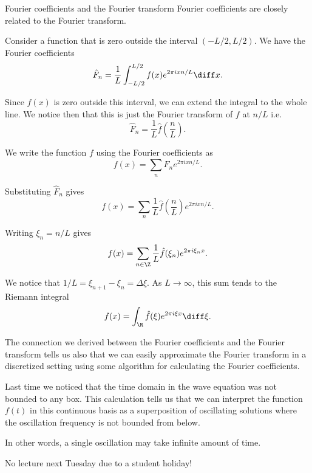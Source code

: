 \begin{frame}{Fourier coefficients and the Fourier transform}
	Fourier coefficients are closely related to the Fourier transform.
	
	\pause
	Consider a function that is zero outside the interval $ (-L/2,L/2) $. We have the Fourier coefficients 
	\[ \hat{F}_n = \frac{1}{L} \int_{-L/2}^{L/2} f(x) e^{2\pi i x n/L} \diff x. \]
	
	\pause
	Since $ f(x) $ is zero outside this interval, we can extend the integral to the whole line. We notice then that this is just the Fourier transform of $ f $ at $ n/L $ i.e. 
	\[ \hat{F}_n = \frac{1}{L} \hat{f}\left(\frac{n}{L}\right). \]
	
	\pause
	We write the function $ f $ using the Fourier coefficients as 
	\[ f(x) = \sum_n \hat{F}_n e^{2\pi i x n/L}. \]
	
	\pause
	Substituting $ \hat{F}_n $ gives
	\[ f(x) = \sum_{n} \frac{1}{L} \hat{f}\left(\frac{n}{L}\right) e^{2\pi i x n/L}. \]
\end{frame}

\begin{frame}
	Writing $ \xi_n = n/L $ gives 
	\[ f(x) = \sum_{n\in\Z} \frac{1}{L} \hat{f}(\xi_n) e^{2\pi i \xi_n x}. \]
	
	\pause
	We notice that $ 1/L = \xi_{n+1} - \xi_{n} = \Delta \xi $. As $ L\to \infty $, this sum tends to the Riemann integral 
	\[ f(x) = \int_\R \hat{f}(\xi) e^{2\pi i \xi x} \diff \xi. \]
	
	\pause
	The connection we derived between the Fourier coefficients and the Fourier transform tells us also that we can easily approximate the Fourier transform in a discretized setting using some algorithm for calculating the Fourier coefficients.
	
	\pause
	Last time we noticed that the time domain in the wave equation was not bounded to any box. This calculation tells us that we can interpret the function $ f(t) $ in this continuous basis as a superposition of oscillating solutions where the oscillation frequency is not bounded from below.
	
	In other words, a single oscillation may take infinite amount of time. 
\end{frame}

\begin{frame}
	\centering
	\alert{No lecture next Tuesday due to a student holiday!}
\end{frame}


